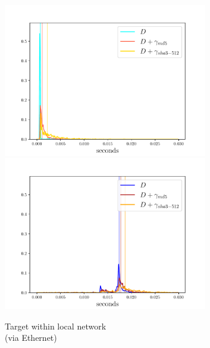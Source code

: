 \documentclass[12pt,a4paper,automark, toc=bib]{scrreprt}
\theoremstyle{definition}
\begin{document}
			\begin{figure}
				\centering
				\begin{subfigure}{0.32\textwidth}
					\centering
					\includegraphics[width=0.98\textwidth]{figures/_LAN_complete_light.pdf}
					\includegraphics[width=0.98\textwidth]{figures/_LAN_complete_dark.pdf}
					\caption{Target within local network\\(via Ethernet)}
				\end{subfigure}
				\centering
				\begin{subfigure}{0.32\textwidth}

\end{subfigure}
\end{figure}
\end{document}
